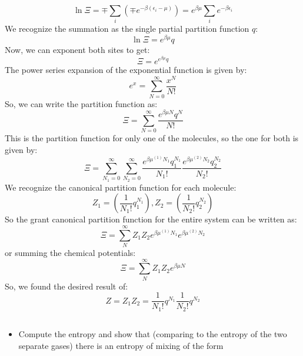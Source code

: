 \documentclass[12pt]{article}
\begin{document}
\begin{equation}
  \ln \Xi = \mp \sum_{i} \left( \mp e^{-\beta(\epsilon_i - \mu)} \right) = e^{\beta \mu} \sum_{i} e^{-\beta \epsilon_i} 
\end{equation}
We recognize the summation as the single partial partition function $q$:
\begin{equation}
  \ln \Xi = e^{\beta \mu} q
\end{equation}
Now, we can exponent both sites to get:
\begin{equation}
  \Xi = e^{e^{\beta \mu} q}
\end{equation}
The power series expansion of the exponential function is given by:
\begin{equation}
  e^x = \sum_{N = 0}^{\infty} \frac{x^N}{N!} 
\end{equation}
So, we can write the partition function as:
\begin{equation}
  \Xi = \sum_{N = 0}^{\infty} \frac{e^{\beta \mu N} q^N}{N!}
\end{equation}
This is the partition function for only one of the molecules, so the one for both is given by:
\begin{equation}
  \Xi = \sum_{N_1 = 0}^{\infty} \sum_{N_2 = 0}^{\infty} \frac{e^{\beta \mu^{(1)} N_1} q_1^{N_1}}{N_1!} \frac{e^{\beta \mu^{(2)} N_2} q_2^{N_2}}{N_2!}
\end{equation}
We recognize the canonical partition function for each molecule:
\begin{equation}
  Z_1 = \left(\frac {1}{N_1!} q_1^{N_1}\right),
Z_2 = \left(\frac {1}{N_2!} q_2^{N_2}\right)
\end{equation}
So the grant canonical partition function for the entire system can be written as:
\begin{equation}
  \Xi = \sum_{N}^{
\infty } Z_1 Z_2 e^{\beta \mu^{(1)} N_1} e^{\beta \mu^{(2)} N_2} 
\end{equation}
or summing the chemical potentials:
\begin{equation}
  \Xi = \sum_{N}^{\infty} Z_1 Z_2 e^{\beta \mu N}
\end{equation}
So, we found the desired result of:
\begin{equation}
  Z = Z_1 Z_2 = \frac{1}{N_1!} q^{N_1} \frac{1}{N_2!} q^{N_2}
\end{equation}
\subsection{}
\begin{itemize}
  \item Compute the entropy and show that (comparing to the entropy of the two separate gases) there is an entropy of mixing of the form
\end{itemize}
\end{document}
